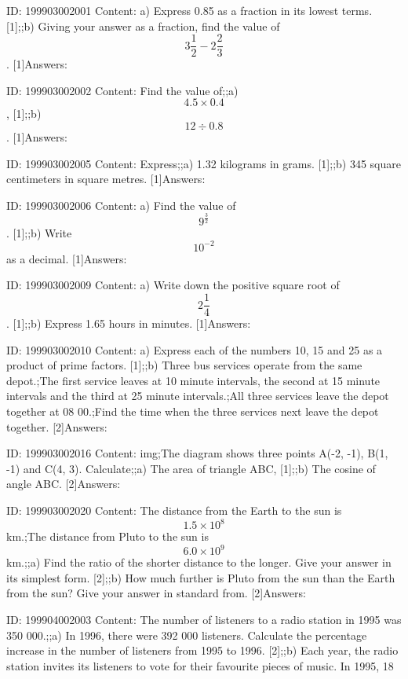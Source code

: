 \documentclass{article}
\begin{document}
ID: 199903002001
Content:
a) Express 0.85 as a fraction in its lowest terms. [1];;b) Giving your answer as a fraction, find the value of $$3 \frac{1}{2} - 2 \frac{2}{3}$$. [1]Answers:

ID: 199903002002
Content:
Find the value of;;a) $$4.5 \times 0.4$$, [1];;b) $$12 \div 0.8$$. [1]Answers:

ID: 199903002005
Content:
Express;;a) 1.32 kilograms in grams. [1];;b) 345 square centimeters in square metres. [1]Answers:

ID: 199903002006
Content:
a) Find the value of $$9^{\frac{3}{2}}$$. [1];;b) Write $$10^{-2}$$ as a decimal. [1]Answers:

ID: 199903002009
Content:
a) Write down the positive square root of $$2 \frac{1}{4}$$. [1];;b) Express 1.65 hours in minutes. [1]Answers:

ID: 199903002010
Content:
a) Express each of the numbers 10, 15 and 25 as a product of prime factors. [1];;b) Three bus services operate from the same depot.;The first service leaves at 10 minute intervals, the second at 15 minute intervals and the third at 25 minute intervals.;All three services leave the depot together at 08 00.;Find the time when the three services next leave the depot together. [2]Answers:

ID: 199903002016
Content:
img;The diagram shows three points A(-2, -1), B(1, -1) and C(4, 3). Calculate;;a) The area of triangle ABC, [1];;b) The cosine of angle ABC. [2]Answers:

ID: 199903002020
Content:
The distance from the Earth to the sun is $$1.5 \times 10^8$$km.;The distance from Pluto to the sun is $$6.0 \times 10^9$$ km.;;a) Find the ratio of the shorter distance to the longer. Give your answer in its simplest form. [2];;b) How much further is Pluto from the sun than the Earth from the sun? Give your answer in standard from. [2]Answers:

ID: 199904002003
Content:
The number of listeners to a radio station in 1995 was 350 000.;;a) In 1996, there were 392 000 listeners. Calculate the percentage increase in the number of listeners from 1995 to 1996. [2];;b) Each year, the radio station invites its listeners to vote for their favourite pieces of music. In 1995, 18%
\end{document}
